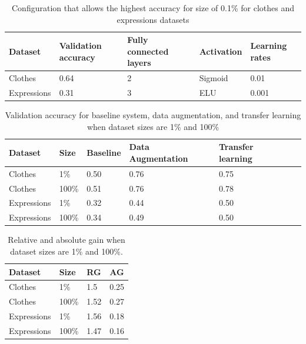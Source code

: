\documentclass{article}
\begin{document}
\begin{table}[!htb]
  \vskip 5mm
  \centering
  \begin{tabular}{| l | l | l | l | l |}
    \hline
    \textbf{Dataset} & \textbf{Validation accuracy} & \textbf{Fully connected layers}& \textbf{Activation} & \textbf{Learning rates}\\ \hline
    Clothes & 0.64 & 2 & Sigmoid & 0.01 \\ \hline
    Expressions & 0.31  & 3 & ELU & 0.001 \\ \hline
  \end{tabular}
  \caption{Configuration that allows the highest accuracy for size of 0.1\% for clothes and expressions datasets}
  \label{tab:tf_1}
\end{table}

\begin{table}[!htb]
  \centering
  \begin{tabular}{| l | l | l | l | l | l |}
    \hline
    \textbf{Dataset} & \textbf{Size} & \textbf{Baseline} & \textbf{Data Augmentation}& \textbf{Transfer learning} \\ \hline
    Clothes & 1\% & 0.50 & 0.76 & 0.75 \\ \hline
    Clothes & 100\% & 0.51 & 0.76 & 0.78 \\ \hline
    Expressions & 1\% & 0.32  & 0.44 & 0.50 \\ \hline
    Expressions & 100\% & 0.34  & 0.49 & 0.50 \\ \hline
  \end{tabular}
  \caption{Validation accuracy for baseline system, data augmentation, and transfer learning when dataset sizes are 1\% and 100\%}
  \label{tab:tf_2}
\end{table}

\begin{table}[!htb]
  \centering
  \begin{tabular}{| l | l | l | l |}
    \hline
    \textbf{Dataset} & \textbf{Size} & \textbf{RG} &\textbf{AG} \\ \hline
    Clothes & 1\% & 1.5 & 0.25 \\ \hline
    Clothes & 100\% & 1.52 & 0.27 \\ \hline
    Expressions & 1\% & 1.56 & 0.18 \\ \hline
    Expressions & 100\% & 1.47 & 0.16 \\ \hline
  \end{tabular}
  \caption{Relative and absolute gain when dataset sizes are
1\% and 100\%.}
  \label{tab:tf_3}
\end{table}
\end{document}
